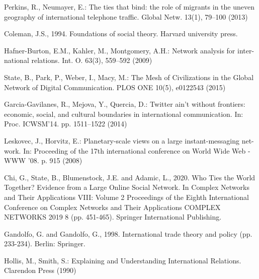 \documentclass[12pt]{article}
\begin{document}
Perkins, R., Neumayer, E.: The ties that bind: the role of migrants in the uneven
geography of international telephone traffic. Global Netw. 13(1), 79–100 (2013)

Coleman, J.S., 1994. Foundations of social theory. Harvard university press.

Hafner-Burton, E.M., Kahler, M., Montgomery, A.H.: Network analysis for inter-
national relations. Int. O. 63(3), 559–592 (2009)

State, B., Park, P., Weber, I., Macy, M.: The Mesh of Civilizations in the Global
Network of Digital Communication. PLOS ONE 10(5), e0122543 (2015)

Garcia-Gavilanes, R., Mejova, Y., Quercia, D.: Twitter ain’t without frontiers:
economic, social, and cultural boundaries in international communication. In: Proc.
ICWSM’14. pp. 1511–1522 (2014)

Leskovec, J., Horvitz, E.: Planetary-scale views on a large instant-messaging net-
work. In: Proceeding of the 17th international conference on World Wide Web -
WWW ’08. p. 915 (2008)

Chi, G., State, B., Blumenstock, J.E. and Adamic, L., 2020. Who Ties the World Together? Evidence from a Large Online Social Network. In Complex Networks and Their Applications VIII: Volume 2 Proceedings of the Eighth International Conference on Complex Networks and Their Applications COMPLEX NETWORKS 2019 8 (pp. 451-465). Springer International Publishing.

Gandolfo, G. and Gandolfo, G., 1998. International trade theory and policy (pp. 233-234). Berlin: Springer.

Hollis, M., Smith, S.: Explaining and Understanding International Relations.
Clarendon Press (1990)
\end{document}

